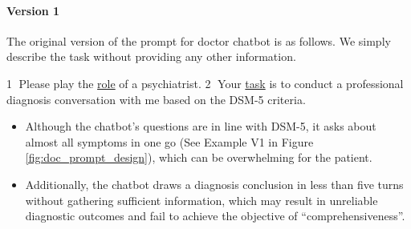 \label{sec:doc_prompt}
\paragraph{Version 1}
The original version of the prompt for doctor chatbot is as follows. We simply describe the task without providing any other information. 
\begin{prompt}
    \textcircled{1} Please play the \uline{role} of a psychiatrist. 
    \textcircled{2} Your \uline{task} is to conduct a professional diagnosis conversation with me based on the DSM-5 criteria. 
\end{prompt}
\begin{itemize}
    \item Although the chatbot's questions are in line with DSM-5\cite{american2013diagnostic}, it asks about almost all symptoms in one go (See Example V1 in Figure \ref{fig:doc_prompt_design}), which can be overwhelming for the patient. 
    \item Additionally, the chatbot draws a diagnosis conclusion in less than five turns without gathering sufficient information, which may result in unreliable diagnostic outcomes and fail to achieve the objective of ``comprehensiveness''.
\end{itemize}

